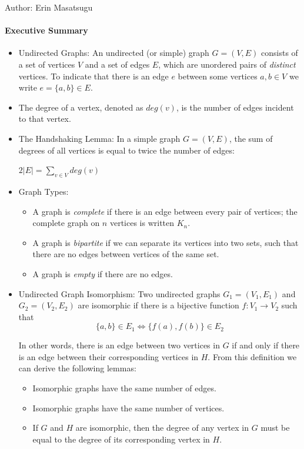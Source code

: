 \documentclass[solution, letterpaper]{cs20inclass}
\begin{document}

\noindent Author: Erin Masatsugu%

\paragraph*{Executive Summary}
\begin{itemize}

\item Undirected Graphs: An undirected (or simple) graph $G = (V,E)$ consists of a set of vertices $V$ and a set of edges $E$, which are unordered pairs of \textit{distinct} vertices. To indicate that there is an edge $e$ between some vertices $a,b \in V$ we write $e = \{a,b\}\in E$. 

\item The degree of a vertex, denoted as $deg(v)$, is the number of edges incident to that vertex.

\item The Handshaking Lemma: In a simple graph $G = (V,E)$, the sum of degrees of all vertices is equal to twice the number of edges:
\begin{center}
$2|E| = \sum\limits_{v \in V}  deg(v)$
\end{center}
\item Graph Types:
\begin{itemize}
\item A graph is \emph{complete} if there is an edge between every pair of vertices; the complete graph on $n$ vertices is written $K_n$. 
\item A graph is \emph{bipartite} if we can separate its vertices into two sets, such that there are no edges between vertices of the same set. 
\item A graph is \emph{empty} if there are no edges. 
\end{itemize}

\item Undirected Graph Isomorphism: Two undirected graphs $G_1 = (V_1, E_1)$ and $G_2 = (V_2, E_2)$ are isomorphic if there is a bijective function $f: V_1 \rightarrow V_2$ such that
  $$\{a,b\} \in E_1 \Leftrightarrow \{f(a),f(b)\} \in E_2  $$

In other words, there is an edge between two vertices in $G$ if and only if there is an edge between their corresponding vertices in $H$. From this definition we can derive the following lemmas:
\begin{itemize}
\item Isomorphic graphs have the same number of edges.
\item Isomorphic graphs have the same number of vertices.
\item If $G$ and $H$ are isomorphic, then the degree of any vertex in $G$ must be equal to the degree of its corresponding vertex in $H$.
\end{itemize}
\end{itemize}
\end{document}
